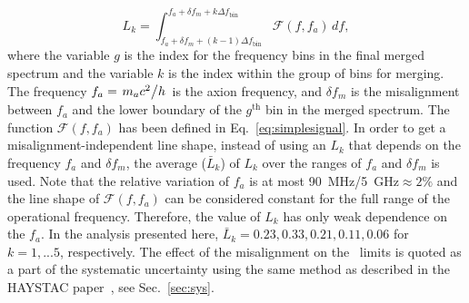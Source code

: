 \begin{equation}
  \label{eq:Lq_integral}
  L_{k} = \int_{f_a +\delta f_m + (k-1)\Delta f_\text{bin}}^{f_a +\delta f_m + k\Delta f_\text{bin}} \mathcal{F}(f,f_a) \,df,
\end{equation}
where the variable $g$ is the index for the frequency bins in 
the final merged spectrum and the variable 
$k$ is the index within the group of bins for 
merging. The frequency $f_a=\left.m_a c^2\middle/h\right.$ is the axion
frequency, and $\delta f_m$ is the misalignment between $f_a$ and the lower
boundary of the $g^\text{th}$ bin in the merged spectrum.
The function $\mathcal{F}(f,f_a)$ has been defined in 
Eq.~\eqref{eq:simplesignal}.
In order to get a misalignment-independent line shape, instead of using an
$L_{k}$ that depends on the frequency $f_a$ and  $\delta f_m$, the average 
($\bar{L}_{k}$) of $L_{k}$ over the ranges of $f_a$ and $\delta f_m$ is 
used. 
Note that the relative variation of $f_a$ is at most 
90~MHz/5~GHz$\approx2\%$ and the line shape of $\mathcal{F}(f,f_a)$ 
can be considered constant for the full range of the operational 
frequency. Therefore, 
the value of $L_{k}$ has only weak dependence on the $f_a$. 
In the analysis presented here, 
$\bar{L}_{k} = 0.23, 0.33, 0.21, 0.11, 0.06$ for $k = 1, ... 5$, respectively.
The effect of the misalignment on the \gagg\ limits is quoted as a part of 
the systematic uncertainty using the same method as described in the HAYSTAC 
paper~\cite{HAYSTACII}, see Sec.~\ref{sec:sys}.

